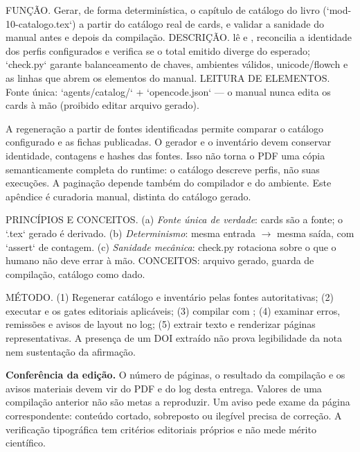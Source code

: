 \begin{descricao}
FUNÇÃO. Gerar, de forma determinística, o capítulo de catálogo do livro
(`mod-10-catalogo.tex`) a partir do catálogo real de cards, e validar a
sanidade do manual antes e depois da compilação. DESCRIÇÃO. 
lê  e , reconcilia a identidade dos
\CoreAgentCount{} perfis configurados e verifica se o total emitido diverge do
esperado; `check.py` garante balanceamento de chaves, ambientes válidos,
unicode/flowch e as linhas que abrem os elementos do manual. LEITURA DE ELEMENTOS. Fonte
única: `agents/catalog/` + `opencode.json` — o manual nunca edita os cards à
mão (proibido editar arquivo gerado).
\end{descricao}

A regeneração a partir de fontes identificadas permite comparar o catálogo
configurado e as fichas publicadas. O gerador e o inventário devem conservar
identidade, contagens e hashes das fontes. Isso não torna o PDF uma cópia
semanticamente completa do runtime: o catálogo descreve perfis, não suas
execuções. A paginação depende também do compilador e do ambiente. Este
apêndice é curadoria manual, distinta do catálogo gerado.

\begin{conceito}
PRINCÍPIOS E CONCEITOS. (a) \emph{Fonte única de verdade}: cards são a fonte;
o `.tex` gerado é derivado. (b) \emph{Determinismo}: mesma entrada $\rightarrow$
mesma saída, com `assert` de contagem. (c) \emph{Sanidade mecânica}: check.py
rotaciona sobre o que o humano não deve errar à mão. CONCEITOS: arquivo
gerado, guarda de compilação, catálogo como dado.
\end{conceito}

\begin{metodo}
MÉTODO. (1) Regenerar catálogo e inventário pelas fontes autoritativas;
(2) executar  e os gates editoriais aplicáveis;
(3) compilar com ;
(4) examinar erros, remissões e avisos de layout no log; (5) extrair texto
e renderizar páginas representativas. A presença de um DOI extraído não
prova legibilidade da nota nem sustentação da afirmação.
\end{metodo}

\begin{resultado}
\textbf{Conferência da edição.} O número de páginas, o resultado da
compilação e os avisos materiais devem vir do PDF e do log desta entrega.
Valores de uma compilação anterior não são metas a reproduzir. Um aviso
 pede exame da página correspondente: conteúdo cortado,
sobreposto ou ilegível precisa de correção. A verificação tipográfica tem
critérios editoriais próprios e não mede mérito científico.
\end{resultado}

